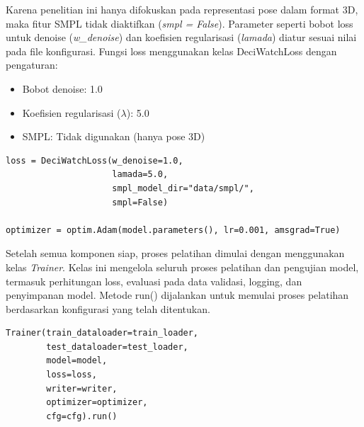 Karena penelitian ini hanya difokuskan pada representasi pose dalam format 3D, maka fitur SMPL tidak diaktifkan (\textit{smpl = False}). Parameter seperti bobot loss untuk denoise (\textit{w\_denoise}) dan koefisien regularisasi (\textit{lamada}) diatur sesuai nilai pada file konfigurasi. Fungsi loss menggunakan kelas {DeciWatchLoss} dengan pengaturan:

\begin{itemize}
    \item Bobot denoise: 1.0
    \item Koefisien regularisasi (\(\lambda\)): 5.0
    \item SMPL: Tidak digunakan (hanya pose 3D)
\end{itemize}

\begin{lstlisting}[style=plainbox, caption={Inisialisasi fungsi loss dan optimizer}, label={lst:loss_optimizer}]
loss = DeciWatchLoss(w_denoise=1.0,
                     lamada=5.0,
                     smpl_model_dir="data/smpl/",
                     smpl=False)

optimizer = optim.Adam(model.parameters(), lr=0.001, amsgrad=True)
\end{lstlisting}

Setelah semua komponen siap, proses pelatihan dimulai dengan menggunakan kelas \textit{Trainer}. Kelas ini mengelola seluruh proses pelatihan dan pengujian model, termasuk perhitungan loss, evaluasi pada data validasi, logging, dan penyimpanan model. Metode {run()} dijalankan untuk memulai proses pelatihan berdasarkan konfigurasi yang telah ditentukan.

\begin{lstlisting}[style=plainbox, caption={Pemanggilan kelas Trainer untuk pelatihan model}, label={lst:trainer}]
Trainer(train_dataloader=train_loader,
        test_dataloader=test_loader,
        model=model,
        loss=loss,
        writer=writer,
        optimizer=optimizer,
        cfg=cfg).run()
\end{lstlisting}



